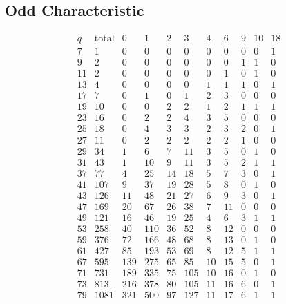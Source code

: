 
\subsection*{Odd Characteristic}
$$
\begin{array}{|r||r||*{9}{r|}}
\hline
q  & \mbox{total}  & 0 & 1 & 2 & 3 & 4 & 6 & 9 & 10 & 18\\
\hline
\hline
7 & 1 & 0 & 0 & 0 & 0 & 0 & 0 & 0 & 0 & 1\\
\hline
9 & 2 & 0 & 0 & 0 & 0 & 0 & 0 & 1 & 1 & 0\\
\hline
11 & 2 & 0 & 0 & 0 & 0 & 0 & 1 & 0 & 1 & 0\\
\hline
13 & 4 & 0 & 0 & 0 & 0 & 1 & 1 & 1 & 0 & 1\\
\hline
17 & 7 & 0 & 1 & 0 & 1 & 2 & 3 & 0 & 0 & 0\\
\hline
19 & 10 & 0 & 0 & 2 & 2 & 1 & 2 & 1 & 1 & 1\\
\hline
23 & 16 & 0 & 2 & 2 & 4 & 3 & 5 & 0 & 0 & 0\\
\hline
25 & 18 & 0 & 4 & 3 & 3 & 2 & 3 & 2 & 0 & 1\\
\hline
27 & 11 & 0 & 2 & 2 & 2 & 2 & 2 & 1 & 0 & 0\\
\hline
29 & 34 & 1 & 6 & 7 & 11 & 3 & 5 & 0 & 1 & 0\\
\hline
31 & 43 & 1 & 10 & 9 & 11 & 3 & 5 & 2 & 1 & 1\\
\hline
37 & 77 & 4 & 25 & 14 & 18 & 5 & 7 & 3 & 0 & 1\\
\hline
41 & 107 & 9 & 37 & 19 & 28 & 5 & 8 & 0 & 1 & 0\\
\hline
43 & 126 & 11 & 48 & 21 & 27 & 6 & 9 & 3 & 0 & 1\\
\hline
47 & 169 & 20 & 67 & 26 & 38 & 7 & 11 & 0 & 0 & 0\\
\hline
49 & 121 & 16 & 46 & 19 & 25 & 4 & 6 & 3 & 1 & 1\\
\hline
53 & 258 & 40 & 110 & 36 & 52 & 8 & 12 & 0 & 0 & 0\\
\hline
59 & 376 & 72 & 166 & 48 & 68 & 8 & 13 & 0 & 1 & 0\\
\hline
61 & 427 & 85 & 193 & 53 & 69 & 8 & 12 & 5 & 1 & 1\\
\hline
67 & 595 & 139 & 275 & 65 & 85 & 10 & 15 & 5 & 0 & 1\\
\hline
71 & 731 & 189 & 335 & 75 & 105 & 10 & 16 & 0 & 1 & 0\\
\hline
73 & 813 & 216 & 378 & 80 & 105 & 11 & 16 & 6 & 0 & 1\\
\hline
79 & 1081 & 321 & 500 & 97 & 127 & 11 & 17 & 6 & 1 & 1\\

\end{array}$$
